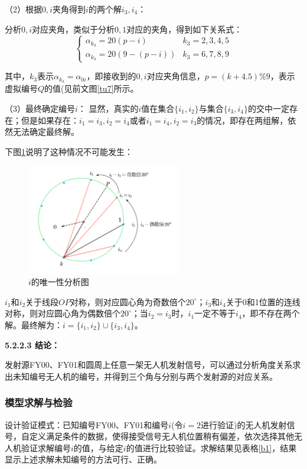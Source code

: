 \documentclass[12pt]{ctexart}
\begin{document}
\begin{spacing}{1.5}
（2）根据$0,i$夹角得到$i$的两个解$i_3,i_4$：

分析$0,i$对应夹角，类似于分析$0,1$对应的夹角，得到如下关系式：
\begin{equation}
	\begin{cases}
		\alpha_{k_3}=20(p-i)	   & k_3=2,3,4,5\\
		\alpha_{k_3}=20(9-(p-i))   & k_3=6,7,8,9
	\end{cases}
\end{equation}

其中，$k_3$表示$\alpha_{k_3}=\alpha_{0i}$，即接收到的$0,i$对应夹角信息，$p=(k+4.5)\%9$，表示虚拟编号$Q$的值(见前文图\ref{tu7}所示。

（3）最终确定编号$i$：
显然，真实的$i$值在集合$\{i_1,i_2\}$与集合$\{i_3,i_4\}$的交中一定存在；但是如果存在：$i_1=i_3,i_2=i_4$或者$i_1=i_4,i_2=i_3$的情况，即存在两组解，依然无法确定最终解。

下图\ref{tu8}说明了这种情况不可能发生：
\begin{figure}[H]
	\centering
	\includegraphics[width=0.6\textwidth]{唯一解证明.png}
	\caption{$i$的唯一性分析图}
	\label{tu8}
\end{figure}

$i_1$和$i_2$关于线段$OP$对称，则对应圆心角为奇数倍个$20^{\circ}$；$i_3$和$i_4$关于0和1位置的连线对称，则对应圆心角为偶数倍个$20^{\circ}$；当$i_2=i_3$时，$i_1$一定不等于$i_4$，即不存在两个解。最终解为：$i=\{i_1,i_2\}\cup\{i_3,i_4\}$。

\textbf{5.2.2.3 结论：}

发射源FY00、FY01和圆周上任意一架无人机发射信号，可以通过分析角度关系求出未知编号无人机的编号，并得到三个角与分别与两个发射源的对应关系。

\subsubsection{模型求解与检验}
设计验证模式：已知编号FY00、FY01和编号$i$(令$i=2$进行验证)的无人机发射信号，自定义满足条件的数据，使得接受信号无人机位置稍有偏差，依次选择其他无人机验证求解编号$i$的值，与给定$i$的值进行比较验证。求解结果见表格\ref{b1}，结果显示上述求解未知编号的方法可行、正确。


\end{spacing}
\end{document}
